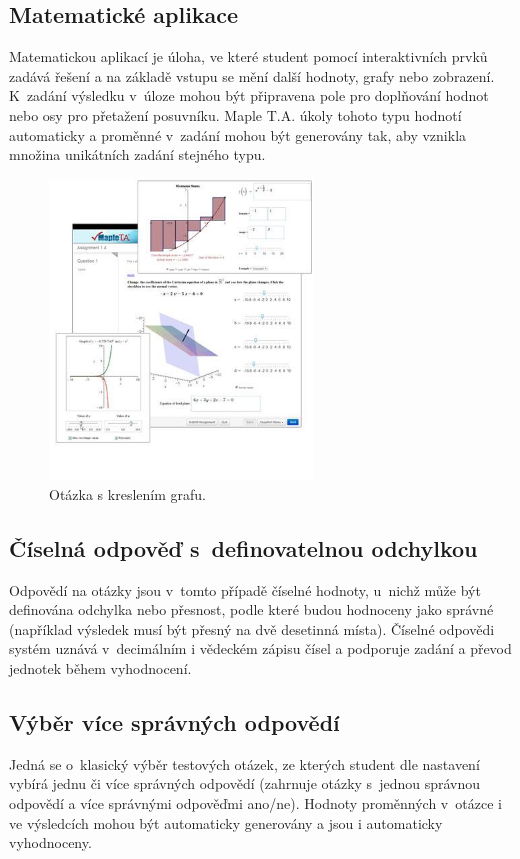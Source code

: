 \documentclass[
print,
  11pt,
  table,   
  nolof,    
  nolot,
  oneside,
  draft
]{fithesis3}
\begin{document}
	\subsection{Matematické aplikace}
Matematickou aplikací je úloha, ve které student pomocí interaktivních prv\-ků zadává řešení a na základě vstupu se mění další hodnoty, grafy nebo zobrazení. K~zadání výsledku v~úloze mohou být připravena pole pro doplňování hodnot nebo osy pro přetažení posuvníku. Maple T.A. úkoly tohoto typu hodnotí automaticky a proměnné v~zadání mohou být generovány tak, aby vznikla množina unikátních zadání stejného typu.
		\begin{figure}[hbt]
		  \begin{center}
		    \includegraphics[width=70mm]{images/MapleTA_math.png}
		   \end{center}
		  \caption{Otázka s kreslením grafu.  \cite{maple-questions}}
		  \label{fig:maplemath}
		\end{figure}

	\subsection{Číselná odpověď s~definovatelnou odchylkou}
Odpovědí na otázky jsou v~tomto případě číselné hodnoty, u~nichž může být definována odchylka nebo přesnost, podle které budou hodnoceny jako správné (například výsledek musí být přesný na dvě desetinná místa). Číselné odpovědi systém uznává v~decimálním i vědeckém zápisu čísel a podporuje zadání a převod jednotek během vyhodnocení.

	\subsection{Výběr více správných odpovědí}
Jedná se o~klasický výběr testových otázek, ze kterých student dle nastavení vybírá jednu či více správných odpovědí (zahrnuje otázky s~jednou správnou odpovědí a více správnými odpověďmi ano/ne). Hodnoty proměnných v~otázce i ve výsledcích mohou být automaticky generovány a jsou i automaticky vyhodnoceny.
\end{document}

